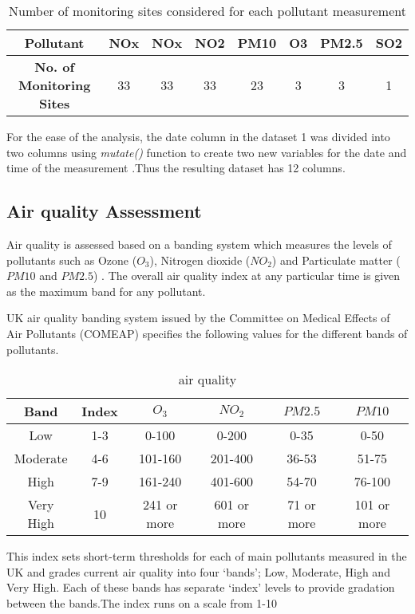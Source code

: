 \documentclass[]{article}
\begin{document}
\begin{table}[H]
	\centering
	\begin{tabular}{|c|c|c|c|c|c|c|c|}\hline
		\textbf{Pollutant} & NOx & NOx & NO2 & PM10 & O3 & PM2.5 & SO2 \\\hline
		\textbf{No. of Monitoring Sites} & 33 & 33 & 33 & 23 & 3 & 3 & 1 \\\hline
	\end{tabular}
	\caption{Number of monitoring sites considered for each pollutant measurement}
	\label{table_3}
\end{table}

For the ease of the analysis, the date column in the dataset 1 was divided into two columns using \emph{mutate()} function to create two new variables for the date and time of the measurement .Thus the resulting dataset has 12 columns.
 
 \subsection{Air quality Assessment}
Air quality is assessed based on a banding system which measures the levels of pollutants such as Ozone ($O_3$), Nitrogen dioxide ($NO_2$) and Particulate matter ($PM10$ and $PM2.5$) . The overall air quality index at any particular time is given as the maximum band for any pollutant. 

UK air quality banding system issued by the Committee on Medical Effects of Air Pollutants (COMEAP) specifies the following values for the different bands of pollutants.
\begin{table}[H]
	\centering
	\begin{tabular}{|c|c|c|c|c|c|}
		\hline
		\textbf{Band} & \textbf{Index} & \textbf{$O_3$} & \textbf{$NO_2$} & \textbf{$PM2.5$} & \textbf{$PM10$} \\
		\hline
		\rowcolor{green!40}Low & 1-3& 0-100 & 0-200 & 0-35 & 0-50\\
		\hline
		\rowcolor{yellow!40}Moderate & 4-6 & 101-160& 201-400 & 36-53 & 51-75 \\
		\hline
		\rowcolor{orange!40}High & 7-9 & 161-240 & 401-600 & 54-70 & 76-100 \\
		\hline
		\rowcolor{red!50}Very High & 10 & 241 or more & 601 or more & 71 or more & 101 or more \\
		
		\hline
	\end{tabular}
	\caption{air quality}
	\label{table_airquality}
\end{table}
This index sets short-term thresholds for each of  main pollutants measured in the UK and grades current air quality into four ‘bands’; Low, Moderate, High and Very High. Each of these bands has separate ‘index’ levels to provide gradation between the bands.The index runs on a scale from 1-10
\end{document}
